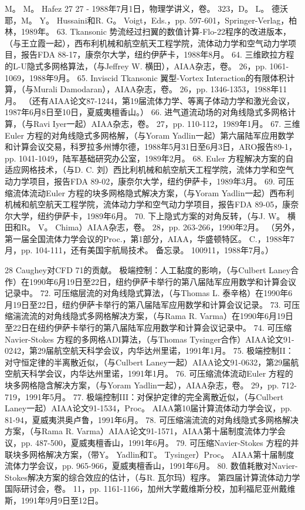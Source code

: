 \documentclass[UTF8,11pt,a4paper,openany,fontset=fandol]{ctexbook}
\begin{document}
M。 M。 Hafez 27 27 - 1988年7月1日，物理学讲义，卷。 323，D。 L。 德沃耶，M。 Y。 Hussaini和R. G。 Voigt，Eds.，pp. 597-601，Springer-Verlag，柏林，1989年。 63. Tkansonic 势流经过扫翼的数值计算-Flo-22程序的改进版本，（与王立霞一起），西布利机械和航空航天工程学院，流体动力学和空气动力学项目，报告FDA 88-17，康奈尔大学，纽约伊萨卡，1988年8月。 64. 三维欧拉方程的L-U隐式多网格算法，（与Jeffrey W. 横田），AIAA杂志，卷。 26，pp. 1061-1069，1988年9月。 65. Inviscid Tkansonic 翼型-Vortex Interaction的有限体积计算，（与Murali Damodaran），AIAA杂志，卷。 26，pp. 1346-1353，1988年11月。 （还有AIAA论文87-1244，第19届流体力学、等离子体动力学和激光会议，1987年6月8日至10日，夏威夷檀香山。） 66. 进气道流动场的对角线隐式多网格计算，（与Ravi Iyer一起）AIAA杂志，卷。 27，pp. 110-112，1989年1月。 67. 三维Euler 方程的对角线隐式多网格解，（与Yoram Yadlin一起）第六届陆军应用数学和计算会议交易，科罗拉多州博尔德，1988年5月31日至6月3日，ARO报告89-1，pp. 1041-1049，陆军基础研究办公室，1989年2月。 68. Euler 方程解决方案的自适应网格技术，（与D. C. 刘）西比利机械和航空航天工程学院，流体力学和空气动力学项目，报告FDA 89-02，康奈尔大学，纽约伊萨卡，1989年3月。 69. 可压缩流体流动Euler 方程的块多网格隐式解决方案，（与Yoram Yadlin一起）西布利机械和航空航天工程学院，流体动力学和空气动力学项目，报告FDA 89-05，康奈尔大学，纽约伊萨卡，1989年6月。 70. 下上隐式方案的对角反转，（与J. W。 横田和R。 V。 Chima）AIAA杂志，卷。 28，pp. 263-266，1990年2月。 （另外，第一届全国流体力学会议的Proc.，第1部分，AIAA，华盛顿特区。 C.，1988年7月，pp. 104-111，还有美国宇航局技术。 备忘录。 100911，1988年7月。）

28 Caughey对CFD 71的贡献。 极端控制：人工黏度的影响，（与Culbert Laney合作）在1990年6月19日至22日，纽约伊萨卡举行的第八届陆军应用数学和计算会议记录中。 72. 可压缩层流的对角线隐式算法，（与Thomas L. 泰辛格）在1990年6月19日至22日，纽约伊萨卡举行的第八届陆军应用数学和计算会议记录。 73. 可压缩湍流流的对角线隐式多网格解决方案，（与Rama R. Varma）在1990年6月19日至22日在纽约伊萨卡举行的第八届陆军应用数学和计算会议记录中。 74. 可压缩Navier-Stokes 方程的多网格ADI算法，（与Thomas Tysinger合作）AIAA论文91-0242，第29届航空航天科学会议，内华达州里诺，1991年1月。 75. 极端控制II：对守恒定律的半离散近似，（与Culbert Laney一起）AIAA论文91-0632，第29届航空航天科学会议，内华达州里诺，1991年1月。 76. 可压缩流体流动Euler 方程的块多网格隐含解决方案，（与Yoram Yadlin一起），AIAA杂志，卷。 29，pp. 712-719，1991年5月。 77. 极端控制III：对保护定律的完全离散近似，（与Culbert Laney一起）AIAA论文91-1534，Proc。 AIAA第10届计算流体动力学会议，pp. 81-94，夏威夷洪奥卢鲁，1991年6月。 78. 可压缩湍流流的对角线隐式多网格解决方案，（与Rama R. Varma）AIAA论文91-1571，AIAA第十届制度流体力学会议，pp. 487-500，夏威夷檀香山，1991年6月。 79. 可压缩Navier-Stokes 方程的并联块多网格解决方案，（带Y。 Yadlin和T。 Tysinger）Proc。 AIAA第十届制度流体力学会议，pp. 965-966，夏威夷檀香山，1991年6月。 80. 数值耗散对Navier-Stokes解决方案的综合效应的估计，（与R. 瓦尔玛）程序。 第四届计算流体动力学国际研讨会，卷。 11，pp. 1161-1166，加州大学戴维斯分校，加利福尼亚州戴维斯，1991年9月9日至12日。
\end{document}
